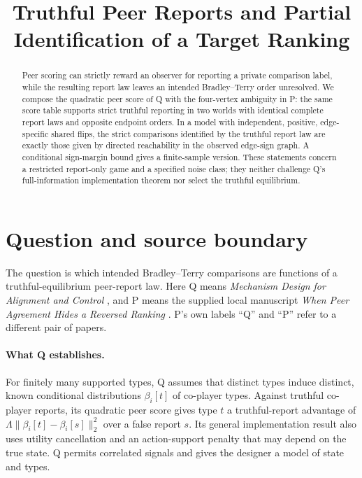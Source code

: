\documentclass{article}
\title{Truthful Peer Reports and Partial Identification of a Target Ranking}
\begin{document}
\maketitle

\begin{abstract}
Peer scoring can strictly reward an observer for reporting a private comparison label, while the
resulting report law leaves an intended Bradley--Terry order unresolved. We compose the quadratic peer
score of Q with the four-vertex ambiguity in P: the same score table supports strict truthful reporting
in two worlds with identical complete report laws and opposite endpoint orders. In a model with
independent, positive, edge-specific shared flips, the strict comparisons identified by the truthful
report law are exactly those given by directed reachability in the observed edge-sign graph. A
conditional sign-margin bound gives a finite-sample version. These statements concern a restricted
report-only game and a specified noise class; they neither challenge Q's full-information implementation
theorem nor select the truthful equilibrium. %
\end{abstract}

\section{Question and source boundary}

The question is which intended Bradley--Terry comparisons are functions of a truthful-equilibrium
peer-report law. Here Q means \emph{Mechanism Design for Alignment and Control} \cite{Q}, and P means the
supplied local manuscript \emph{When Peer Agreement Hides a Reversed Ranking} \cite{P}. P's own labels
``Q'' and ``P'' refer to a different pair of papers. %

\paragraph{What Q establishes.}
For finitely many supported types, Q assumes that distinct types induce distinct, known conditional
distributions \(\beta_i[t]\) of co-player types. Against truthful co-player reports, its quadratic peer
score gives type \(t\) a truthful-report advantage of \(\Lambda\|\beta_i[t]-\beta_i[s]\|_2^2\) over a
false report \(s\). Its general implementation result also uses utility cancellation and an
action-support penalty that may depend on the true state. Q permits correlated signals and gives the
designer a model of state and types. %
\end{document}
